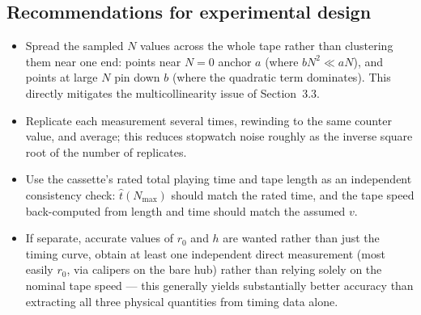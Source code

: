 \documentclass[12pt,oneside,a4paper]{article}
\begin{document}
\subsection{Recommendations for experimental design}

\begin{itemize}
\item Spread the sampled $N$ values across the whole tape rather
  than clustering them near one end: points near $N=0$ anchor $a$
  (where $bN^2 \ll aN$), and points at large $N$ pin down $b$ (where
  the quadratic term dominates). This directly mitigates the
  multicollinearity issue of Section~3.3.
\item Replicate each measurement several times, rewinding to the
  same counter value, and average; this reduces stopwatch noise
  roughly as the inverse square root of the number of replicates.
\item Use the cassette's rated total playing time and tape length as
  an independent consistency check: $\hat t(N_{\max})$ should match
  the rated time, and the tape speed back-computed from length and
  time should match the assumed $v$.
\item If separate, accurate values of $r_0$ and $h$ are wanted
  rather than just the timing curve, obtain at least one independent
  direct measurement (most easily $r_0$, via calipers on the bare
  hub) rather than relying solely on the nominal tape speed --- this
  generally yields substantially better accuracy than extracting all
  three physical quantities from timing data alone.
\end{itemize}
\end{document}
